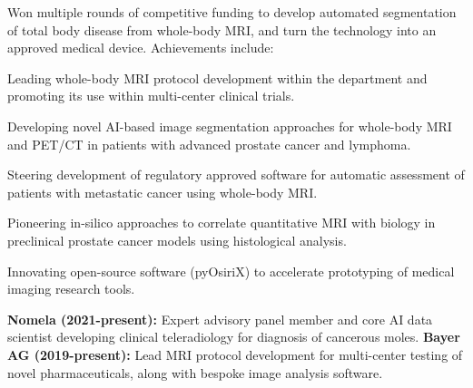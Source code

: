 \documentclass[]{mbcv}
\begin{document}
\begin{minipage}[t]{0.65\textwidth}
Won multiple rounds of competitive funding to develop automated segmentation of total body disease from whole-body MRI, and turn the technology into an approved medical device. Achievements include:

\vspace*{10pt}
\begin{tightemize}
\item Leading whole-body MRI protocol development within the department and promoting its use within multi-center clinical trials. 
\item Developing novel AI-based image segmentation approaches for whole-body MRI and PET/CT in patients with advanced prostate cancer and lymphoma.
\item Steering development of regulatory approved software for automatic assessment of patients with metastatic cancer using whole-body MRI.
\item Pioneering in-silico approaches to correlate quantitative MRI with biology in preclinical prostate cancer models using histological analysis.
\item Innovating open-source software (pyOsiriX) to accelerate prototyping of medical imaging research tools.

\end{tightemize}

\sectionsep

\textbf{Nomela (2021-present):} Expert advisory panel member and core AI data scientist developing clinical   teleradiology for diagnosis of cancerous moles.
\newline
\newline
\textbf{Bayer AG (2019-present):} Lead MRI protocol development for multi-center testing of novel pharmaceuticals, along with bespoke image analysis software.


\end{minipage}

\newpage
\end{document}
